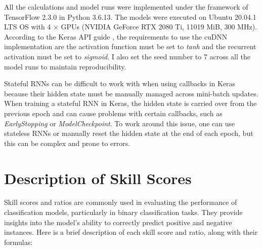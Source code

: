All the calculations and model runs were implemented under the framework of TensorFlow 2.3.0 \citep{singh_2020} in Python 3.6.13. 
The models were executed on Ubuntu 20.04.1 LTS OS with 4 × GPUs (NVIDIA GeForce RTX 2080 Ti, 11019 MiB, 300 MHz).
According to the Keras API guide \citep{keras_2017}, the requirements to use the cuDNN implementation are the activation function must be set to \textit{tanh} and the recurrent activation must be set to \textit{sigmoid}.
I also set the seed number to 7 across all the model runs to maintain reproducibility.

Stateful RNNs can be difficult to work with when using callbacks in Keras because their hidden state must be manually managed across mini-batch updates. When training a stateful RNN in Keras, the hidden state is carried over from the previous epoch and can cause problems with certain callbacks, such as \textit{EarlyStopping} or \textit{ModelCheckpoint}. To work around this issue, one can use stateless RNNs or manually reset the hidden state at the end of each epoch, but this can be complex and prone to errors.

\section{Description of Skill Scores}
\label{skillscores_appendix}
Skill scores and ratios are commonly used in evaluating the performance of classification models, particularly in binary classification tasks. They provide insights into the model's ability to correctly predict positive and negative instances. Here is a brief description of each skill score and ratio, along with their formulas:

